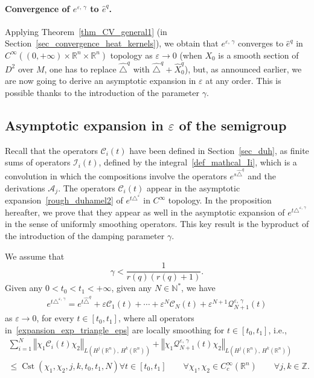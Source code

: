 \documentclass[AHL,Unicode,published]{cedram}
\newcommand*\R{\mathbb{R}}
\newcommand*\N{\mathbb{N}}
\newcommand*\Z{\mathbb{Z}}
\newcommand{\calQ}{\mathcal{Q}}
\newcommand{\calA}{\mathcal{A}}
\newcommand{\calC}{\mathcal{C}}
\newcommand{\calI}{\mathcal{I}}
\DeclareMathOperator{\Cst}{Cst}
\renewcommand{\leq}{\leqslant}
\let\oldforall\forall
\renewcommand*{\forall}{\mathrel{\oldforall}}
\begin{document}
\paragraph{Convergence of $e^{\varepsilon,\,\gamma}$ to $\widehat{e}^{q}$.}
Applying Theorem~\ref{thm_CV_general1} (in Section~\ref{sec_convergence_heat_kernels}), we obtain that $e^{\varepsilon,\,\gamma}$ converges to $\widehat{e}^{q}$ in $C^\infty((0,+\infty)\times\R^n\times\R^n)$ topology as $\varepsilon\rightarrow 0$ (when $X_0$ is a smooth section of $D^2$ over $M$, one has to replace $\widehat{\triangle}^{q}$ with $\widehat{\triangle}^{q} +\widehat{X}_0^{q}$), but, as announced earlier, we are now going to derive an asymptotic expansion in $\varepsilon$ at any order. This is possible thanks to the introduction of the parameter $\gamma$.



\subsection{Asymptotic expansion in \texorpdfstring{$\varepsilon$}{varepsilon} of the semigroup}\label{sec:asymptotic_expansion_epsilongamma}
Recall that the operators $\calC_i(t)$ have been defined in Section~\ref{sec_duh}, as finite sums of operators $\calI_i(t)$, defined by the integral~\eqref{def_mathcal_Ii}, which is a convolution in which the compositions involve the operators $e^{s\widehat{\triangle}^{q}}$ and the derivations $\calA_j$. The operators $\calC_i(t)$ appear in the asymptotic expansion~\eqref{rough_duhamel2} of $e^{t\triangle^\varepsilon}$ in $C^\infty$ topology. In the proposition hereafter, we prove that they appear as well in the asymptotic expansion of $e^{t\triangle^{\varepsilon,\,\gamma}}$ in the sense of uniformly smoothing operators. This key result is the byproduct of the introduction of the damping parameter $\gamma$.

\begin{prop}\label{prop_expansion_semigroup_epsgam}
We assume that
\[
\gamma<\frac{1}{r(q)(r(q)+1)}.
\]
Given any $0<t_0<t_1<+\infty$, given any $N\in\N^*$, we have
\begin{equation}\label{expansion_exp_triangle_eps}
\begin{split}
e^{t\triangle^{\varepsilon,\,\gamma}} = e^{t \widehat{\triangle}^{q}} + \varepsilon \calC_1(t) + \cdots + \varepsilon^N \calC_N(t) + \varepsilon^{N+1} \calQ_{N+1}^{\varepsilon,\,\gamma}(t)
\end{split}
\end{equation}
as $\varepsilon\rightarrow 0$, for every $t\in[t_0,t_1]$, where all operators in~\eqref{expansion_exp_triangle_eps} are locally smoothing for $t\in[t_0,t_1]$, i.e.,
\begin{multline*}
\sum_{i=1}^N\left\Vert\chi_1\calC_i(t)\chi_2\right\Vert_{L\left(H^j(\R^n),\,H^k(\R^n)\right)} + \left\Vert\chi_1\calQ_{N+1}^{\varepsilon,\,\gamma}(t)\chi_2\right\Vert_{L\left(H^j(\R^n),\,H^k(\R^n)\right)} \\
\leq \Cst\left(\chi_1,\chi_2,j,k,t_0,t_1,N\right) 
\forall t\in[t_0,t_1] \qquad \forall \chi_1,\chi_2\in C^\infty_c(\R^n) \qquad\forall j,k\in\Z.
\end{multline*}
\end{prop}
\end{document}
